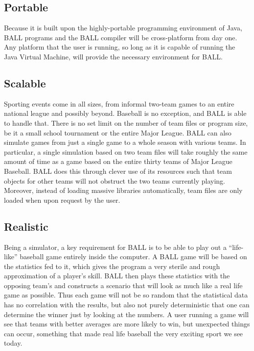 \subsection{Portable}
Because it is built upon the highly-portable programming environment of Java, BALL programs and the BALL compiler will be cross-platform from day one. Any platform that the user is running, so long as it is capable of running the Java Virtual Machine, will provide the necessary environment for BALL.

\subsection{Scalable}
Sporting events come in all sizes, from informal two-team games to an entire national league and possibly beyond. Baseball is no exception, and BALL is able to handle that. There is no set limit on the number of team files or program size, be it a small school tournament or the entire Major League. BALL can also simulate games from just a single game to a whole season with various teams. In particular, a single simulation based on two team files will take roughly the same amount of time as a game based on the entire thirty teams of Major League Baseball. BALL does this through clever use of its resources such that team objects for other teams will not obstruct the two teams currently playing. Moreover, instead of loading massive libraries automatically, team files are only loaded when upon request by the user.

\subsection{Realistic}
Being a simulator, a key requirement for BALL is to be able to play out a ``life-like'' baseball game entirely inside the computer. A BALL game will be based on the statistics fed to it, which gives the program a very sterile and rough approximation of a player's skill. BALL then plays these statistics with the opposing team's and constructs a scenario that will look as much like a real life game as possible. Thus each game will not be so random that the statistical data has no correlation with the results, but also not purely deterministic that one can determine the winner just by looking at the numbers. A user running a game will see that teams with better averages are more likely to win, but unexpected things can occur, something that made real life baseball the very exciting sport we see today.

